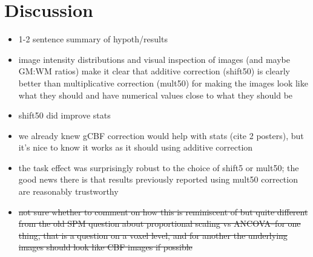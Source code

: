 \section{Discussion}

\begin{itemize}
\item 1-2 sentence summary of hypoth/results
\item image intensity distributions and visual inspection of images (and maybe GM:WM ratios) make it clear that additive correction (shift50) is clearly better than multiplicative correction (mult50) for making the images look like what they should and have numerical values close to what they should be
\item shift50 did improve stats
\item we already knew gCBF correction would help with stats (cite 2 posters), but it's nice to know it works as it should using additive correction
\item the task effect was surprisingly robust to the choice of shift5 or mult50; the good news there is that results previously reported using  mult50 correction are reasonably trustworthy
\item \sout{not sure whether to comment on how this is reminiscent of but quite different from the old SPM question about proportional scaling vs ANCOVA--for one thing, that is a question on a voxel level, and for another the underlying images should look like CBF images if possible}
\end{itemize}

